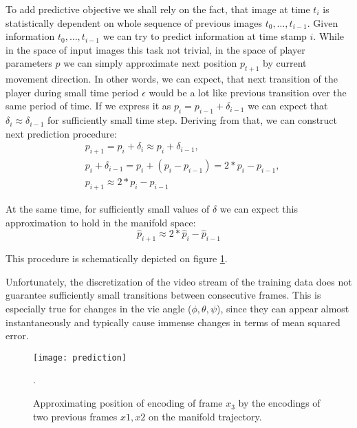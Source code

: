 To add predictive objective we shall rely on the fact, that image at time $t_i$ is statistically dependent on whole sequence of previous images ${t_0, \ldots, t_{i-1}}$.
Given information ${t_0, \ldots, t_{i-1}}$ we can try to predict information at time stamp $i$.
While in the space of input images this task not trivial, in the space of player parameters $p$ we can simply approximate next position $p_{t+1}$ by current movement direction.
In other words, we can expect, that next transition of the player during small time period $\epsilon$ would be a lot like previous transition over the same period of time.
If we express it as $p_i = p_{i-1} + \delta_{i-1}$ we can expect that $\delta_i \approx \delta_{i-1}$ for sufficiently small time step. Deriving from that, we can construct next prediction procedure:
\begin{equation}
  \begin{aligned}
    &p_{i+1} = p_i + \delta_i \approx p_i + \delta_{i-1},\\
    &p_i + \delta_{i-1} = p_i + (p_i - p_{i-1}) = 2*p_i - p_{i-1}, \\
    &p_{i+1} \approx 2*p_i - p_{i-1}
  \end{aligned}
\end{equation}

At the same time, for sufficiently small values of $\delta$ we can expect this approximation to hold in the manifold space:
\begin{equation}
  \hat{p}_{i+1} \approx 2*\hat{p}_i - \hat{p}_{i-1}
\end{equation}

This procedure is schematically depicted on figure \ref{fig:m_pred}.

Unfortunately, the discretization of the video stream of the training data does not guarantee sufficiently small transitions between consecutive frames.
This is especially true for changes in the vie angle ($\phi, \theta, \psi$), since they can appear almost instantaneously and typically cause immense changes in terms of mean squared error.

\begin{figure}[h!]
  \centering
    \texttt{[image: prediction]}
  \caption{Approximating position of encoding of frame $x_3$ by the encodings of two previous frames $x1, x2$ on the manifold trajectory.}.
  \label{fig:m_pred}
\end{figure}


